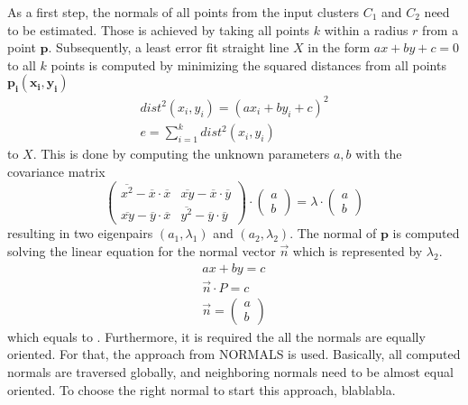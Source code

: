 As a first step, the normals of all points from the input clusters $C_1$ and $C_2$ need to be estimated. Those is achieved by taking all points $k$ within a radius $r$ from a point $\boldsymbol{p}$. Subsequently, a least error fit straight line $X$ in the form $ax + by +c = 0$ to all $k$ points is computed by minimizing the squared distances from all points $\boldsymbol{p_i(x_i,y_i)}$
\begin{equation}
\begin{split}
dist^2(x_i, y_i) = (ax_i + by_i + c)^2
\\
e =   \displaystyle\sum_{i=1}^{k} dist^2(x_i, y_i)
\end{split}
\end{equation}
to $X$. This is done by computing the unknown parameters $a, b$ with the covariance matrix 
\begin{equation}
\begin{pmatrix}
\overline{x^2} - \overline{x} \cdot \overline{x} & \overline{xy} -\overline{x} \cdot \overline{y}\\
\overline{xy} -\overline{y} \cdot \overline{x} & \overline{y^2} -\overline{y} \cdot \overline{y}
\end{pmatrix} \cdot \begin{pmatrix}
a \\
b
\end{pmatrix} = \lambda \cdot \begin{pmatrix}
a \\
b
\end{pmatrix}
\end{equation}
resulting in two eigenpairs $(a_1,\lambda_1)$ and $(a_2,\lambda_2)$. The normal of $\boldsymbol{p}$ is computed solving the linear equation for the normal vector $\vec{n}$ which is represented by $\lambda_2$.
\begin{equation}
\begin{split}
ax + by = c
\\
\vec{n} \cdot P = c
\\
\vec{n} = \begin{pmatrix} a \\ b \end{pmatrix}
\end{split}
\label{eq:normalEstimation}
\end{equation}
which equals to .  Furthermore, it is required the all the normals are equally oriented. For that, the approach from NORMALS is used. Basically, all computed normals are traversed globally, and neighboring normals need to be almost equal oriented. To choose the right normal to start this approach, blablabla.

